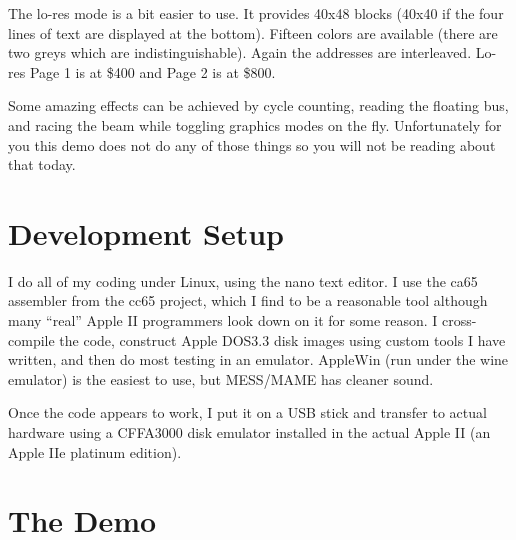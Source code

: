 \documentclass[twocolumn]{article}
\begin{document}
The lo-res mode is a bit easier to use.  
It provides 40x48 blocks (40x40 if the four
lines of text are displayed at the bottom).
Fifteen colors are available (there are two greys which are indistinguishable).
Again the addresses are interleaved.  Lo-res Page 1 is at \$400
and Page 2 is at \$800.

Some amazing effects can be achieved by cycle counting, reading
the floating bus, and racing the beam while toggling graphics
modes on the fly.
Unfortunately for you this demo does not do any of those things
so you will not be reading about that today.




\section{Development Setup}

I do all of my coding under Linux, using the nano text editor.
I use the ca65 assembler from the cc65 project, which I find to be a reasonable
tool although many ``real'' Apple II programmers look down on it for some
reason.
I cross-compile the code, construct Apple DOS3.3 disk images using
custom tools I have written, and then do most testing in an emulator.
AppleWin (run under the wine emulator) is the easiest to use, but
MESS/MAME has cleaner sound.

Once the code appears to work, I put it on a USB stick and transfer
to actual hardware using a CFFA3000 disk emulator installed in
the actual Apple II (an Apple IIe platinum edition).

%






\section{The Demo}
\end{document}
